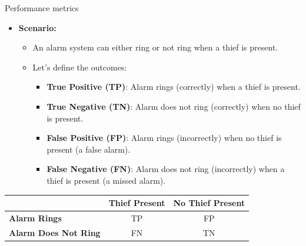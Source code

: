 \documentclass[serif, aspectratio=169]{beamer}
\begin{document}
\begin{frame}{Performance metrics}
    \begin{itemize}
        \item \textbf{Scenario:}
        \begin{itemize}
            \item An alarm system can either ring or not ring when a thief is present.
            \item Let's define the outcomes:
            \begin{itemize}
                \item \textbf{True Positive (TP)}: Alarm rings (correctly) when a thief is present.
                \item \textbf{True Negative (TN)}: Alarm does not ring (correctly) when no thief is present.
                \item \textbf{False Positive (FP)}: Alarm rings (incorrectly) when no thief is present (a false alarm).
                \item \textbf{False Negative (FN)}: Alarm does not ring (incorrectly) when a thief is present (a missed alarm).
            \end{itemize}
        \end{itemize}
    \end{itemize}
    
    
    \begin{minipage}{0.7\textwidth} %
        \begin{table}[h!]
            \centering
            \begin{tabular}{@{}lcc@{}}
                \toprule
                & \textbf{Thief Present} & \textbf{No Thief Present} \\ \midrule
                \textbf{Alarm Rings} & TP & FP \\
                \textbf{Alarm Does Not Ring} & FN & TN \\ \bottomrule
            \end{tabular}
        \end{table}
        

\end{minipage}
\end{frame}
\end{document}
